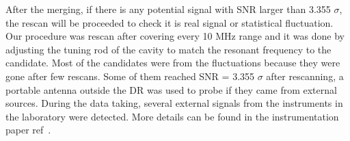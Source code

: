 After the merging, if there is any potential signal with SNR larger than 3.355 $\sigma$,
the rescan will be proceeded to check it is real signal or statistical fluctuation.
Our procedure was rescan after covering every 10 MHz range and it was done by adjusting
the tuning rod of the cavity to match the resonant frequency to the candidate.
Most of the candidates were from the fluctuations because they were gone after few rescans.
Some of them reached SNR = 3.355 $\sigma$ after rescanning, a portable antenna outside the DR was used
to probe if they came from external sources. During the data taking, several external signals from the instruments
in the laboratory were detected. More details can be found in the instrumentation paper ref~\cite{}.
